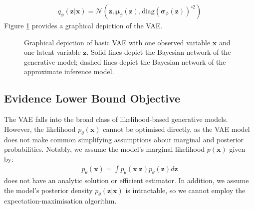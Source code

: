 \documentclass[ oneside,%
                    author={George Herbert},
                    degree={MSci},
                     title={Video Diffusion Models for Climate Simulations},
                  subtitle={}]{dissertation}
\begin{document}
\begin{align}
      q_\phi(\mathbf{z}|\mathbf{x})=\mathcal{N}(\mathbf{z}, \boldsymbol{\mu}_\phi(\mathbf{z}), \mathrm{diag}(\boldsymbol\sigma_\phi(\mathbf{z}))^{\circ 2})
\end{align}
Figure \ref{fig:vae} provides a graphical depiction of the VAE.
\begin{figure}[htbp]
      \centering
      \caption{Graphical depiction of basic VAE with one observed variable $\mathbf{x}$ and one latent variable $\mathbf{z}$. Solid lines depict the Bayesian network of the generative model; dashed lines depict the Bayesian network of the approximate inference model.}
      \label{fig:vae}
\end{figure}

\subsection{Evidence Lower Bound Objective}
\label{sec:background_vae_elbo}

The VAE falls into the broad class of likelihood-based generative models. However, the likelihood $p_\theta(\mathbf{x})$ cannot be optimised directly, as the VAE model does not make common simplifying assumptions about marginal and posterior probabilities. Notably, we assume the model's marginal likelihood $p(\mathbf{x})$ given by:
\begin{align}
      p_\theta(\mathbf{x}) = \int p_\theta(\mathbf{x}|\mathbf{z})p_\theta(\mathbf{z}) d\mathbf{z}
\end{align}
does not have an analytic solution or efficient estimator. In addition, we assume the model's posterior density $p_\theta(\mathbf{z}|\mathbf{x})$ is intractable, so we cannot employ the expectation-maximisation algorithm.
\end{document}
